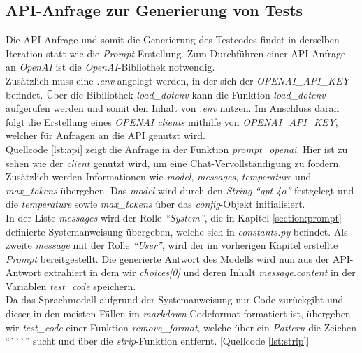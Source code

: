 \subsection{API-Anfrage zur Generierung von Tests}
Die API-Anfrage und somit die Generierung des Testcodes findet in derselben Iteration statt wie die \textit{Prompt}-Erstellung. Zum Durchführen einer API-Anfrage an \textit{OpenAI} ist die \textit{OpenAI}-Bibliothek notwendig.\\ Zusätzlich muss eine \textit{.env} angelegt werden, in der sich der \textit{OPENAI\_API\_KEY} befindet. Über die Bibiliothek \textit{load\_dotenv} kann die Funktion \textit{load\_dotenv} aufgerufen werden und somit den Inhalt von \textit{.env} nutzen. Im Anschluss daran folgt die Erstellung eines \textit{OPENAI clients} mithilfe von \textit{OPENAI\_API\_KEY}, welcher für Anfragen an die API genutzt wird. \\Quellcode \ref{lst:api} zeigt die Anfrage in der Funktion \textit{prompt\_openai}. Hier ist zu sehen wie der \textit{client} genutzt wird, um eine Chat-Vervollständigung zu fordern. \\
\vspace{-.3cm}
Zusätzlich werden Informationen wie \textit{model}, \textit{messages}, \textit{temperature} und \textit{max\_tokens} übergeben. Das \textit{model} wird durch den \textit{String} \textit{``gpt-4o''} festgelegt und die \textit{temperature} sowie \textit{max\_tokens} über das \textit{config}-Objekt initialisiert.\\ In der Liste \textit{messages} wird der Rolle \textit{``System''}, die in Kapitel \ref{section:prompt} definierte Systemanweisung übergeben, welche sich in \textit{constants.py} befindet. Als zweite \textit{message} mit der Rolle \textit{``User''}, wird der im vorherigen Kapitel erstellte \textit{Prompt} bereitgestellt. Die generierte Antwort des Modells wird nun aus der API-Antwort extrahiert in dem wir \textit{choices[0]} und deren Inhalt \textit{message.content} in der Variablen \textit{test\_code} speichern.\\ Da das Sprachmodell aufgrund der
Systemanweisung nur Code zurückgibt und dieser in den meisten Fällen im \textit{markdown}-Codeformat formatiert ist, übergeben wir \textit{test\_code} einer Funktion \textit{remove\_format}, welche über ein \textit{Pattern} die Zeichen ``\`{}\`{}\`{}'' sucht und über die \textit{strip}-Funktion entfernt. [Quellcode \ref{lst:strip}]\\
\vspace{-.3cm}


